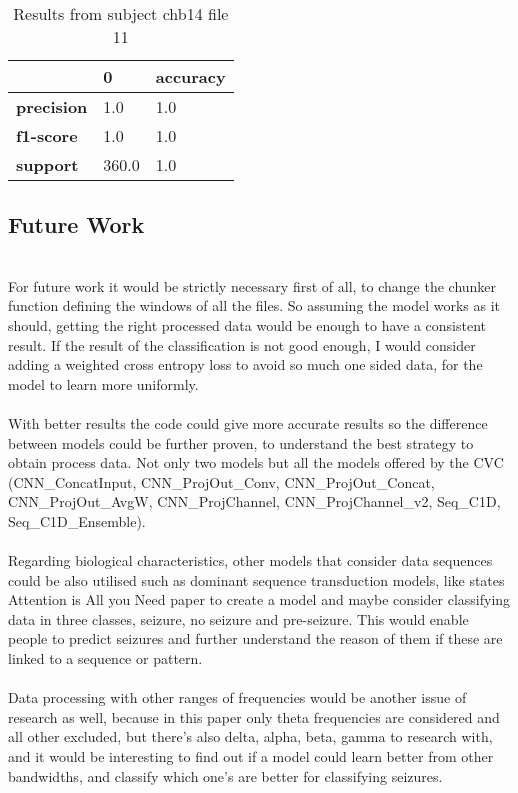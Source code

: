 \begin{table}[]
    \centering
    \caption{Results from subject chb14 file 11}
    \begin{tabular}{|l|l|l|}
        \hline
                        & \textbf{0} & \textbf{accuracy} \\ \hline
        \textbf{precision} & 1.0        & 1.0               \\ \hline
        \textbf{f1-score}  & 1.0        & 1.0               \\ \hline
        \textbf{support}   & 360.0      & 1.0               \\ \hline
    \end{tabular}
\end{table}


\subsection{Future Work}
\leavevmode\\
For future work it would be strictly necessary first of all, to change the chunker function defining the windows of all the files. So assuming the model works as it should, getting the right processed data would be enough to have a consistent result. If the result of the classification is not good enough, I would consider adding a weighted cross entropy loss to avoid so much one sided data, for the model to learn more uniformly.
\\\\
With better results the code could give more accurate results so the difference between models could be further proven, to understand the best strategy to obtain process data. Not only two models but all the models offered by the CVC (CNN\_ConcatInput, CNN\_ProjOut\_Conv, CNN\_ProjOut\_Concat, CNN\_ProjOut\_AvgW, CNN\_ProjChannel, CNN\_ProjChannel\_v2, Seq\_C1D, Seq\_C1D\_Ensemble).
\\\\
Regarding biological characteristics, other models that consider data sequences could be also utilised such as dominant sequence transduction models, like states Attention is All you Need paper to create a model and maybe consider classifying data in three classes, seizure, no seizure and pre-seizure. This would enable people to predict seizures and further understand the reason of them if these are linked to a sequence or pattern.
\\\\
Data processing with other ranges of frequencies would be another issue of research as well, because in this paper only theta frequencies are considered and all other excluded, but there’s also delta, alpha, beta, gamma to research with, and it would be interesting to find out if a model could learn better from other bandwidths, and classify which one’s are better for classifying seizures.
